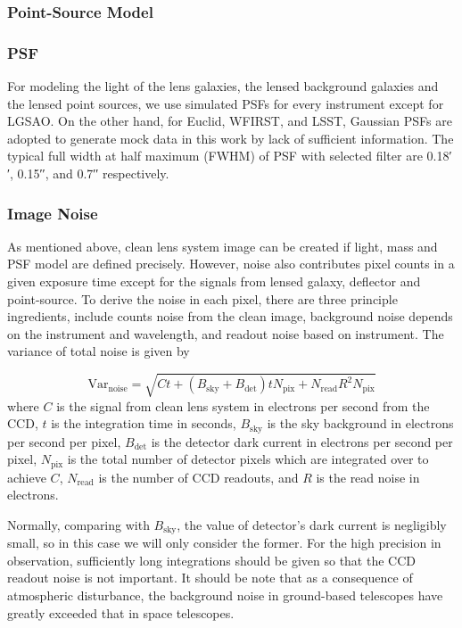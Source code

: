 \documentclass[a4paper,11pt]{article}
\begin{document}
\subsubsection{Point-Source Model}




\subsubsection{PSF}

For modeling the light of the lens galaxies, the lensed background galaxies and the lensed point sources, we use simulated PSFs for every instrument except for LGSAO. On the other hand, for Euclid, WFIRST, and LSST, Gaussian PSFs are adopted to generate mock data in this work by lack of sufficient information. The typical full width at half maximum (FWHM) of PSF with selected filter are 0.18′′, 0.15′′, and 0.7′′ respectively.


\subsubsection{Image Noise}

As mentioned above, clean lens system image can be created if light, mass and PSF model are defined precisely. However, noise also contributes pixel counts in a given exposure time except for the signals from lensed galaxy, deflector and point-source. To derive the noise in each pixel, there are three principle ingredients, include counts noise from the clean image, background noise depends on the instrument and wavelength, and readout noise based on instrument. The variance of total noise is given by

\begin{equation}
   \label{eq:noise}
   \mathrm{Var}_{\mathrm{noise}} = \sqrt{Ct+(B_{\mathrm{sky}}+B_{\mathrm{det}}) t N_{\mathrm{pix}} + N_{\mathrm{read}} R^{2} N_{\mathrm{pix}}}
\end{equation}
where $C$ is the signal from clean lens system in electrons per second from the CCD, $t$ is the integration time in seconds, $B_{\mathrm{sky}}$ is the sky background in electrons per second per pixel, $B_{\mathrm{det}}$ is the detector dark current in electrons per second per pixel, $N_{\mathrm{pix}}$ is the total number of detector pixels which are integrated over to achieve $C$, $N_{\mathrm{read}}$ is the number of CCD readouts, and $R$ is the read noise in electrons. 

Normally, comparing with $B_{\mathrm{sky}}$, the value of detector's dark current is negligibly small, so in this case we will only consider the former. For the high precision in observation, sufficiently long integrations should be given so that the CCD readout noise is not important. It should be note that as a consequence of atmospheric disturbance, the background noise in ground-based telescopes have greatly exceeded that in space telescopes.
\end{document}
